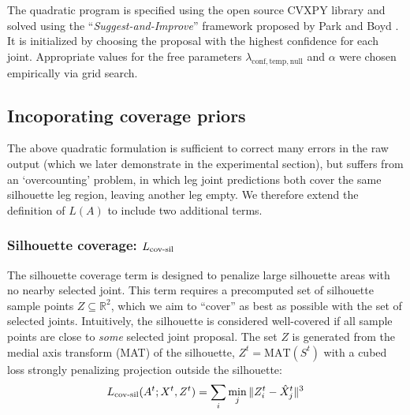 
The quadratic program is specified using the open source CVXPY library \cite{diamond2016cvxpy} and solved using the ``\emph{Suggest-and-Improve}'' framework proposed by Park and Boyd \cite{park2017general}. It is initialized by choosing the proposal with the highest confidence for each joint. Appropriate values for the free parameters $\lambda_{\text{conf}, \text{temp}, \text{null}}$ and $\alpha$ were chosen empirically via grid search. 

\subsection{Incoporating coverage priors}

The above quadratic formulation is sufficient to correct many errors in the raw output (which we later demonstrate in the experimental section), but suffers from an `overcounting' problem, in which leg joint predictions both cover the same silhouette leg region, leaving another leg empty. We therefore extend the definition of $L(A)$ to include two additional terms. 

\def\silhouette{S}

\subsubsection{Silhouette coverage: $L_{\textrm{cov-sil}}$}

The silhouette coverage term is designed to penalize large silhouette areas with no nearby selected joint. This term requires a precomputed set of silhouette sample points $Z \subseteq \mathbb{R}^2$, which we aim to ``cover'' as best as possible with the set of selected joints. Intuitively, the silhouette is considered well-covered if all sample points are close to \emph{some} selected joint proposal. The set $Z$ is generated from the medial axis transform (MAT)\cite{blum1967transformation} of the silhouette, $Z^{t} = \text{MAT}(\silhouette^{t})$
with a cubed loss strongly penalizing projection outside the silhouette:
\begin{equation}
L_{\textrm{cov-sil}}(A^{t};X^{t},Z^{t}) = \sum_{i}\min_{j}\|Z_{i}^{t} - \hat{X}_{j}^{t}\|^3
\end{equation}

